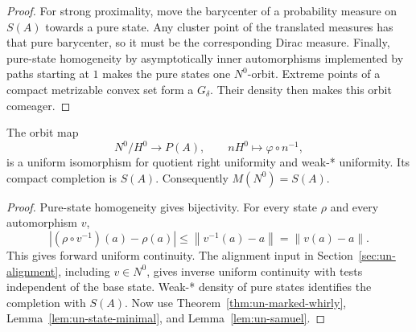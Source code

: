\begin{proof}
For strong proximality, move the barycenter of a probability measure
on \(S(A)\) towards a pure state. Any cluster point of the translated
measures has that pure barycenter, so it must be the corresponding
Dirac measure. Finally, pure-state homogeneity by asymptotically
inner automorphisms implemented by paths starting at \(1\)
\cite[Theorem 2.1]{KishimotoOzawaSakai2003} makes the pure states one \(N^0\)-orbit.
Extreme points of a compact metrizable convex set form a \(G_\delta\).
Their density then makes this orbit comeager.
\end{proof}

\begin{proposition}\label{prop:un-state-completion}
The orbit map
\[
 N^0/H^0\longrightarrow P(A),\qquad
 nH^0\longmapsto\varphi\circ n^{-1},
\]
is a uniform isomorphism for quotient right uniformity and weak-*
uniformity. Its compact completion is \(S(A)\).
Consequently \(M(N^0)=S(A)\).
\end{proposition}
\begin{proof}
Pure-state homogeneity gives bijectivity. For every state \(\rho\)
and every automorphism \(v\),
\[
 |(\rho\circ v^{-1})(a)-\rho(a)|
 \leq\left\lVert v^{-1}(a)-a\right\rVert=\left\lVert v(a)-a\right\rVert.
\]
This gives forward uniform continuity.
The alignment input in Section~\ref{sec:un-alignment}, including \(v\in N^0\), gives
inverse uniform continuity with tests independent of the base state.
Weak-* density of pure states identifies the completion with \(S(A)\).
Now use Theorem~\ref{thm:un-marked-whirly},
Lemma~\ref{lem:un-state-minimal}, and Lemma~\ref{lem:un-samuel}.
\end{proof}

